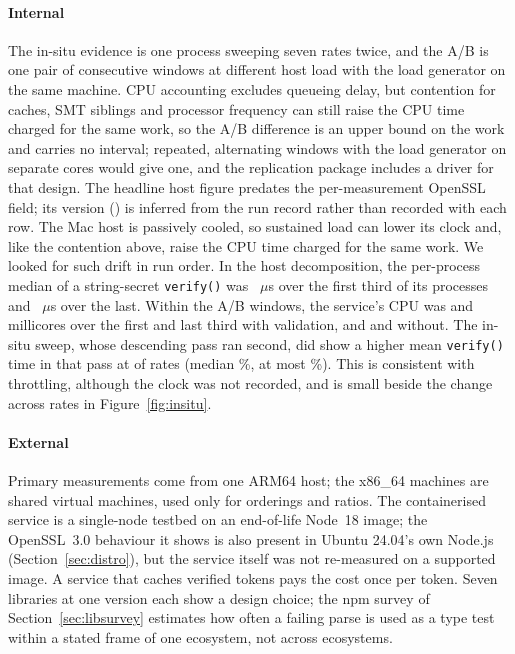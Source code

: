 \documentclass[preprint,12pt,authoryear]{elsarticle}
\begin{document}
\paragraph{Internal} The in-situ evidence is one process sweeping seven rates
twice, and the A/B is one pair of consecutive windows at different host load
with the load generator on the same machine. CPU accounting excludes queueing
delay, but contention for caches, SMT siblings and processor frequency can still
raise the CPU time charged for the same work, so the A/B difference is an upper
bound on the work and carries no interval; repeated, alternating windows with
the load generator on separate cores would give one, and the replication
package includes a driver for that design. The headline host figure predates
the per-measurement OpenSSL field; its version (\HostOpensslInferred) is
inferred from the run record rather than recorded with each row.
The Mac host is passively cooled, so sustained load can lower its clock and,
like the contention above, raise the CPU time charged for the same work. We
looked for such drift in run order. In the host decomposition, the per-process
median of a string-secret \texttt{verify()} was \DriftHostFirst~$\mu$s over the
first third of its \DriftHostProcs{} processes and \DriftHostLast~$\mu$s over the
last. Within the A/B windows, the service's CPU was \DriftAbJwtFirst{} and
\DriftAbJwtLast{} millicores over the first and last third with validation, and
\DriftAbNoneFirst{} and \DriftAbNoneLast{} without. The in-situ sweep, whose
descending pass ran second, did show a higher mean \texttt{verify()} time in
that pass at \DriftSweepSlowerRates{} of \DriftSweepRates{} rates (median
\DriftSweepMedianPct\%, at most \DriftSweepMaxPct\%). This is consistent with
throttling, although the clock was not recorded, and is small beside the change
across rates in Figure~\ref{fig:insitu}.

\paragraph{External} Primary measurements come from one ARM64 host; the
x86\_64 machines are shared virtual machines, used only for orderings and
ratios. The containerised service is a single-node testbed on an end-of-life
Node~18 image; the OpenSSL~3.0 behaviour it shows is also present in Ubuntu
24.04's own Node.js (Section~\ref{sec:distro}), but the service itself was not
re-measured on a supported image. A service that caches verified tokens pays
the cost once per token. Seven libraries at one version each show a design
choice; the npm survey of Section~\ref{sec:libsurvey} estimates how often a
failing parse is used as a type test within a stated frame of one ecosystem,
not across ecosystems.
\end{document}
